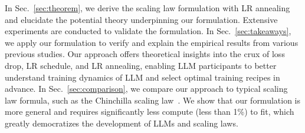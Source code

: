 In Sec.~\ref{sec:theorem}, we derive the scaling law formulation with LR annealing and elucidate the potential theory underpinning our formulation. Extensive experiments are conducted to validate the formulation.
In Sec.~\ref{sec:takeaways}, we apply our formulation to verify and explain the empirical results from various previous studies. 
Our approach offers theoretical insights into the crux of loss drop, LR schedule, and LR annealing,
enabling LLM participants to better understand training dynamics of LLM and select optimal training recipes in advance.
In Sec.~\ref{sec:comparison}, we compare our approach to typical scaling law formula, such as the Chinchilla scaling law~\citep{hoffmann2022training}. We show that 
our formulation is more general and requires significantly less compute (less than 1\%) to fit,
which greatly democratizes the development of LLMs and scaling laws.
